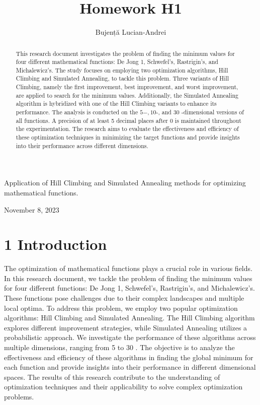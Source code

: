 \documentclass[10pt]{article}
\title{Homework H1 }
\author{Bujență Lucian-Andrei}
\date{}
\begin{document}
\maketitle
Application of Hill Climbing and Simulated Annealing methods for optimizing mathematical functions.

November 8, 2023

\begin{abstract}
This research document investigates the problem of finding the minimum values for four different mathematical functions: De Jong 1, Schwefel's, Rastrigin's, and Michalewicz's. The study focuses on employing two optimization algorithms, Hill Climbing and Simulated Annealing, to tackle this problem. Three variants of Hill Climbing, namely the first improvement, best improvement, and worst improvement, are applied to search for the minimum values. Additionally, the Simulated Annealing algorithm is hybridized with one of the Hill Climbing variants to enhance its performance. The analysis is conducted on the $5-, 10$-, and 30 -dimensional versions of all functions. A precision of at least 5 decimal places after 0 is maintained throughout the experimentation. The research aims to evaluate the effectiveness and efficiency of these optimization techniques in minimizing the target functions and provide insights into their performance across different dimensions.
\end{abstract}

\section*{1 Introduction}
The optimization of mathematical functions plays a crucial role in various fields. In this research document, we tackle the problem of finding the minimum values for four different functions: De Jong 1, Schwefel's, Rastrigin's, and Michalewicz's. These functions pose challenges due to their complex landscapes and multiple local optima. To address this problem, we employ two popular optimization algorithms: Hill Climbing and Simulated Annealing. The Hill Climbing algorithm explores different improvement strategies, while Simulated Annealing utilizes a probabilistic approach. We investigate the performance of these algorithms across multiple dimensions, ranging from 5 to 30 . The objective is to analyze the effectiveness and efficiency of these algorithms in finding the global minimum for each function and provide insights into their performance in different dimensional spaces. The results of this research contribute to the understanding of optimization techniques and their applicability to solve complex optimization problems.
\end{document}
